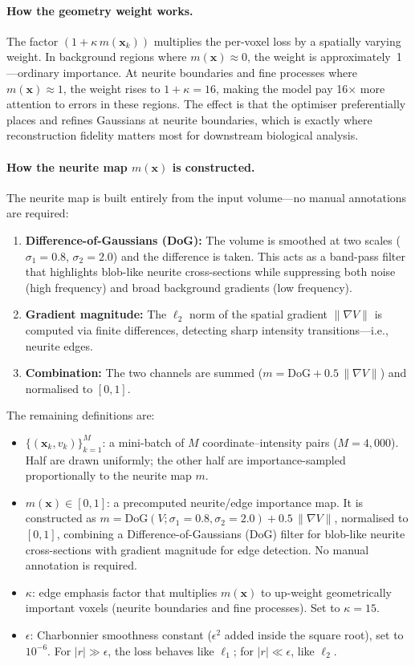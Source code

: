 \documentclass[11pt,a4paper]{article}
\begin{document}
\paragraph{How the geometry weight works.}
The factor $(1 + \kappa\, m(\mathbf{x}_k))$ multiplies the per-voxel loss by a spatially varying weight.  In background regions where $m(\mathbf{x}) \approx 0$, the weight is approximately~1---ordinary importance.  At neurite boundaries and fine processes where $m(\mathbf{x}) \approx 1$, the weight rises to $1 + \kappa = 16$, making the model pay 16$\times$ more attention to errors in these regions.  The effect is that the optimiser preferentially places and refines Gaussians at neurite boundaries, which is exactly where reconstruction fidelity matters most for downstream biological analysis.

\paragraph{How the neurite map $m(\mathbf{x})$ is constructed.}
The neurite map is built entirely from the input volume---no manual annotations are required:
\begin{enumerate}
    \item \textbf{Difference-of-Gaussians (DoG):} The volume is smoothed at two scales ($\sigma_1 = 0.8$, $\sigma_2 = 2.0$) and the difference is taken.  This acts as a band-pass filter that highlights blob-like neurite cross-sections while suppressing both noise (high frequency) and broad background gradients (low frequency).
    \item \textbf{Gradient magnitude:} The $\ell_2$ norm of the spatial gradient $\|\nabla V\|$ is computed via finite differences, detecting sharp intensity transitions---i.e., neurite edges.
    \item \textbf{Combination:} The two channels are summed ($m = \mathrm{DoG} + 0.5\,\|\nabla V\|$) and normalised to $[0,1]$.
\end{enumerate}

The remaining definitions are:
\begin{itemize}
    \item $\{(\mathbf{x}_k, v_k)\}_{k=1}^M$: a mini-batch of $M$ coordinate--intensity pairs ($M=4{,}000$).  Half are drawn uniformly; the other half are importance-sampled proportionally to the neurite map $m$.
    \item $m(\mathbf{x})\in[0,1]$: a precomputed neurite/edge importance map.  It is constructed as $m = \mathrm{DoG}(V;\sigma_1{=}0.8,\sigma_2{=}2.0) + 0.5\,\|\nabla V\|$, normalised to $[0,1]$, combining a Difference-of-Gaussians (DoG) filter for blob-like neurite cross-sections with gradient magnitude for edge detection.  No manual annotation is required.
    \item $\kappa$: edge emphasis factor that multiplies $m(\mathbf{x})$ to up-weight geometrically important voxels (neurite boundaries and fine processes).  Set to $\kappa=15$.
    \item $\epsilon$: Charbonnier smoothness constant ($\epsilon^2$ added inside the square root), set to $10^{-6}$.  For $|r|\gg\epsilon$, the loss behaves like $\ell_1$; for $|r|\ll\epsilon$, like $\ell_2$.
\end{itemize}
\end{document}
